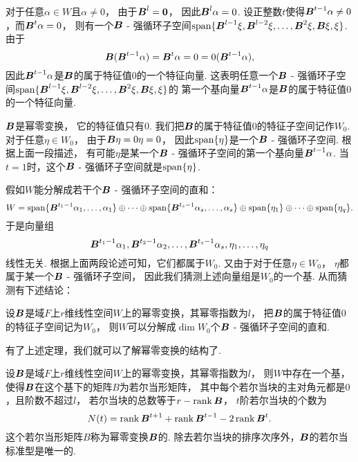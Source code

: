 对于任意\(\alpha \in W\)且\(\alpha\neq0\)，
由于\(\boldsymbol{B}^l=\boldsymbol0\)，
因此\(\boldsymbol{B}^l\alpha=0\).
设正整数\(t\)使得\(\boldsymbol{B}^{t-1}\alpha\neq0\)，而\(\boldsymbol{B}^t\alpha=0\)，
则有一个\(\boldsymbol{B}\) - 强循环子空间\(\operatorname{span}\{\boldsymbol{B}^{l-1}\xi,\boldsymbol{B}^{l-2}\xi,\dotsc,\boldsymbol{B}^2\xi,\boldsymbol{B}\xi,\xi\}\).
由于\begin{equation*}
	\boldsymbol{B}(\boldsymbol{B}^{t-1}\alpha)
	= \boldsymbol{B}^t\alpha
	= 0
	= 0(\boldsymbol{B}^{t-1}\alpha),
\end{equation*}
因此\(\boldsymbol{B}^{t-1}\alpha\)是\(\boldsymbol{B}\)的属于特征值\(0\)的一个特征向量.
这表明任意一个\(\boldsymbol{B}\) - 强循环子空间\(\operatorname{span}\{\boldsymbol{B}^{l-1}\xi,\boldsymbol{B}^{l-2}\xi,\dotsc,\boldsymbol{B}^2\xi,\boldsymbol{B}\xi,\xi\}\)的
第一个基向量\(\boldsymbol{B}^{t-1}\alpha\)是\(\boldsymbol{B}\)的属于特征值\(0\)的一个特征向量.

\(\boldsymbol{B}\)是幂零变换，
它的特征值只有\(0\).
我们把\(\boldsymbol{B}\)的属于特征值\(0\)的特征子空间记作\(W_0\).
对于任意\(\eta \in W_0\)，
由于\(\boldsymbol{B}\eta = 0\eta = 0\)，
因此\(\operatorname{span}\{\eta\}\)是一个\(\boldsymbol{B}\) - 强循环子空间.
根据上面一段描述，
有可能\(\eta\)是某一个\(\boldsymbol{B}\) - 强循环子空间的第一个基向量\(\boldsymbol{B}^{t-1}\alpha\).
当\(t=1\)时，这个\(\boldsymbol{B}\) - 强循环子空间就是\(\operatorname{span}\{\eta\}\).

假如\(W\)能分解成若干个\(\boldsymbol{B}\) - 强循环子空间的直和：\begin{equation*}
	W = \operatorname{span}\{\boldsymbol{B}^{t_1-1}\alpha_1,\dotsc,\alpha_1\}
		\oplus \dotsb
		\oplus \operatorname{span}\{\boldsymbol{B}^{t_s-1}\alpha_s,\dotsc,\alpha_s\}
		\oplus \operatorname{span}\{\eta_1\}
		\oplus \dotsb
		\oplus \operatorname{span}\{\eta_q\}.
\end{equation*}
于是向量组\begin{equation*}
	\boldsymbol{B}^{t_1-1}\alpha_1,
	\boldsymbol{B}^{t_2-1}\alpha_2,
	\dotsc,
	\boldsymbol{B}^{t_s-1}\alpha_s,
	\eta_1,
	\dotsc,
	\eta_q
\end{equation*}线性无关.
根据上面两段论述可知，它们都属于\(W_0\).
又由于对于任意\(\eta \in W_0\)，
\(\eta\)都属于某一个\(\boldsymbol{B}\) - 强循环子空间，
因此我们猜测上述向量组是\(W_0\)的一个基.
从而猜测有下述结论：
\begin{theorem}
设\(\boldsymbol{B}\)是域\(F\)上\(r\)维线性空间\(W\)上的幂零变换，其幂零指数为\(l\)，
把\(\boldsymbol{B}\)的属于特征值\(0\)的特征子空间记为\(W_0\)，
则\(W\)可以分解成\(\dim W_0\)个\(\boldsymbol{B}\) - 强循环子空间的直和.
\end{theorem}

有了上述定理，我们就可以了解幂零变换的结构了.
\begin{theorem}\label{theorem:幂零变换的结构.幂零变换的若尔当标准型}
设\(\boldsymbol{B}\)是域\(F\)上\(r\)维线性空间\(W\)上的幂零变换，其幂零指数为\(l\)，
则\(W\)中存在一个基，使得\(\boldsymbol{B}\)在这个基下的矩阵\(B\)为若尔当形矩阵，
其中每个若尔当块的主对角元都是\(0\)，且阶数不超过\(l\)，
若尔当块的总数等于\(r - \rank\boldsymbol{B}\)，
\(t\)阶若尔当块的个数为\begin{equation}
	N(t) = \rank\boldsymbol{B}^{t+1} + \rank\boldsymbol{B}^{t-1} - 2 \rank\boldsymbol{B}^t.
\end{equation}
\rm
这个若尔当形矩阵\(B\)称为幂零变换\(\boldsymbol{B}\)的.
除去若尔当块的排序次序外，\(\boldsymbol{B}\)的若尔当标准型是唯一的.
\end{theorem}

